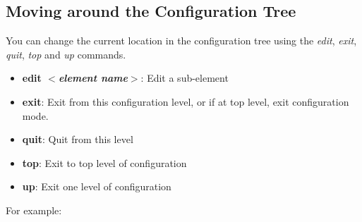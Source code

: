 \documentclass[11pt]{article}
\begin{document}
\noindent{}
\vspace{0.1in}

\subsection{Moving around the Configuration Tree}
You can change the current location in the configuration tree using
the \emph{edit}, \emph{exit}, \emph{quit}, \emph{top} and \emph{up} commands.
\begin{itemize}
\item \textbf{edit $<$\textit{element name}$>$}:       Edit a sub-element
\item \textbf{exit}:       Exit from this configuration level, or if
at top level, exit configuration mode.
\item \textbf{quit}:       Quit from this level
\item \textbf{top}:        Exit to top level of configuration
\item \textbf{up}:         Exit one level of configuration
\end{itemize}

\noindent
For example:
\vspace{0.1in}
\end{document}
